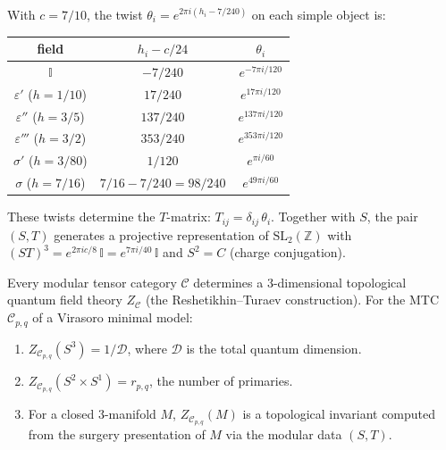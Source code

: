 \begin{computation}\label{comp:twist-5-4}
With $c = 7/10$, the twist $\theta_i = e^{2\pi i(h_i - 7/240)}$ on each simple
object is:
\begin{center}
\renewcommand{\arraystretch}{1.2}
\begin{tabular}{ccc}
\hline
field & $h_i - c/24$ & $\theta_i$ \\
\hline
$\mathbb{I}$ & $-7/240$ & $e^{-7\pi i/120}$ \\
$\varepsilon'$ ($h = 1/10$) & $17/240$ & $e^{17\pi i/120}$ \\
$\varepsilon''$ ($h = 3/5$) & $137/240$ & $e^{137\pi i/120}$ \\
$\varepsilon'''$ ($h = 3/2$) & $353/240$ & $e^{353\pi i/120}$ \\
$\sigma'$ ($h = 3/80$) & $1/120$ & $e^{\pi i/60}$ \\
$\sigma$ ($h = 7/16$) & $7/16 - 7/240 = 98/240$ & $e^{49\pi i/60}$ \\
\hline
\end{tabular}
\end{center}
These twists determine the $T$-matrix: $T_{ij} = \delta_{ij}\,\theta_i$.
Together with $S$, the pair $(S, T)$ generates a projective representation
of $\mathrm{SL}_2(\mathbb{Z})$ with $(ST)^3 = e^{2\pi i c/8}\,\mathbb{I} =
e^{7\pi i/40}\,\mathbb{I}$ and $S^2 = C$ (charge conjugation).
\end{computation}

\begin{theorem}\label{thm:mtc-tqft}
Every modular tensor category $\mathcal{C}$ determines a $3$-dimensional
topological quantum field theory $Z_{\mathcal{C}}$ (the Reshetikhin--Turaev
construction). For the MTC $\mathcal{C}_{p,q}$ of a Virasoro minimal model:
\begin{enumerate}
\item $Z_{\mathcal{C}_{p,q}}(S^3) = 1/\mathcal{D}$, where $\mathcal{D}$ is the total quantum dimension.
\item $Z_{\mathcal{C}_{p,q}}(S^2 \times S^1) = r_{p,q}$, the number of primaries.
\item For a closed $3$-manifold $M$, $Z_{\mathcal{C}_{p,q}}(M)$ is a topological
invariant computed from the surgery presentation of $M$ via the modular data
$(S, T)$.
\end{enumerate}
\end{theorem}

